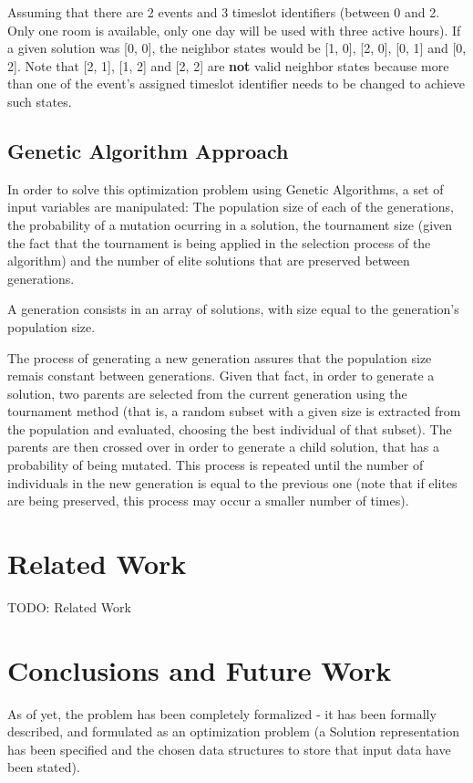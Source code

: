 \documentclass[conference]{IEEEtran}
\begin{document}
Assuming that there are 2 events and 3 timeslot identifiers (between 0 and 2. Only one room is available, only one day will be used with three active hours). If a given solution was [0, 0], the neighbor states would be [1, 0], [2, 0], [0, 1] and [0, 2]. Note that [2, 1], [1, 2] and [2, 2] are \textbf{not} valid neighbor states because more than one of the event's assigned timeslot identifier needs to be changed to achieve such states.

\subsection{Genetic Algorithm Approach}

In order to solve this optimization problem using Genetic Algorithms, a set of input variables are manipulated: The population size of each of the generations, the probability of a mutation ocurring in a solution, the tournament size (given the fact that the tournament is being applied in the selection process of the algorithm) and the number of elite solutions that are preserved between generations.

A generation consists in an array of solutions, with size equal to the generation's population size.

The process of generating a new generation assures that the population size remais constant between generations. Given that fact, in order to generate a solution, two parents are selected from the current generation using the tournament method (that is, a random subset with a given size is extracted from the population and evaluated, choosing the best individual of that subset). The parents are then crossed over in order to generate a child solution, that has a probability of being mutated. This process is repeated until the number of individuals in the new generation is equal to the previous one (note that if elites are being preserved, this process may occur a smaller number of times).


\section{Related Work}

TODO: Related Work

\section{Conclusions and Future Work}

As of yet, the problem has been completely formalized - it has been formally described, and formulated as an optimization problem (a Solution representation has been specified and the chosen data structures to store that input data have been stated).
\end{document}
